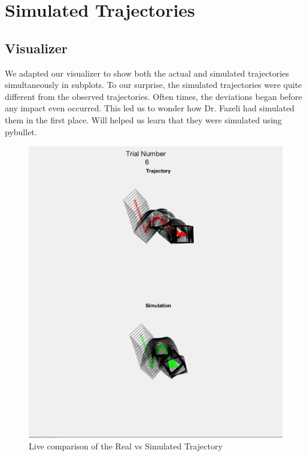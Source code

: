 \documentclass{article}
\begin{document}
\section{Simulated Trajectories}


\subsection{Visualizer}
We adapted our visualizer to show both the actual and simulated trajectories simultaneously in subplots. To our surprise, the simulated trajectories were quite different from the observed trajectories. Often times, the deviations began before any impact even occurred. This led us to wonder how Dr. Fazeli had simulated them in the first place. Will helped us learn that they were simulated using pybullet.

 \begin{figure}[h!]
        \centering
        \includegraphics[scale=0.5]{Captura de pantalla 2020-08-03 a la(s) 13.51.25.png}
        \caption{Live comparison of the Real vs Simulated Trajectory}
        \label{fig:RealvsSim}
\end{figure}
\end{document}
